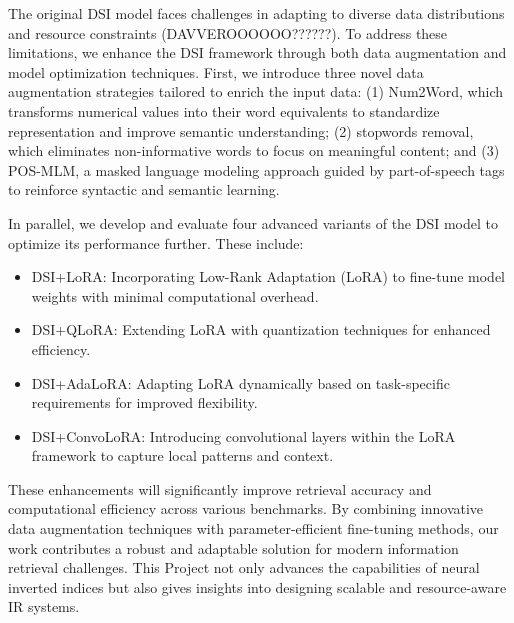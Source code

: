 The original DSI model faces challenges in adapting to diverse data distributions and resource constraints (DAVVEROOOOOO??????). To address these limitations, we enhance the DSI framework through both data augmentation and model optimization techniques. First, we introduce three novel data augmentation strategies tailored to enrich the input data: (1) Num2Word, which transforms numerical values into their word equivalents to standardize representation and improve semantic understanding; (2) stopwords removal, which eliminates non-informative words to focus on meaningful content; and (3) POS-MLM, a masked language modeling approach guided by part-of-speech tags to reinforce syntactic and semantic learning.

In parallel, we develop and evaluate four advanced variants of the DSI model to optimize its performance further. These include:
\begin{itemize}
    \item DSI+LoRA: Incorporating Low-Rank Adaptation (LoRA) to fine-tune model weights with minimal computational overhead.
    \item DSI+QLoRA: Extending LoRA with quantization techniques for enhanced efficiency.
    \item DSI+AdaLoRA: Adapting LoRA dynamically based on task-specific requirements for improved flexibility.
    \item DSI+ConvoLoRA: Introducing convolutional layers within the LoRA framework to capture local patterns and context.
\end{itemize}


These enhancements will significantly improve retrieval accuracy and computational efficiency across various benchmarks. By combining innovative data augmentation techniques with parameter-efficient fine-tuning methods, our work contributes a robust and adaptable solution for modern information retrieval challenges. This Project not only advances the capabilities of neural inverted indices but also gives insights into designing scalable and resource-aware IR systems.

